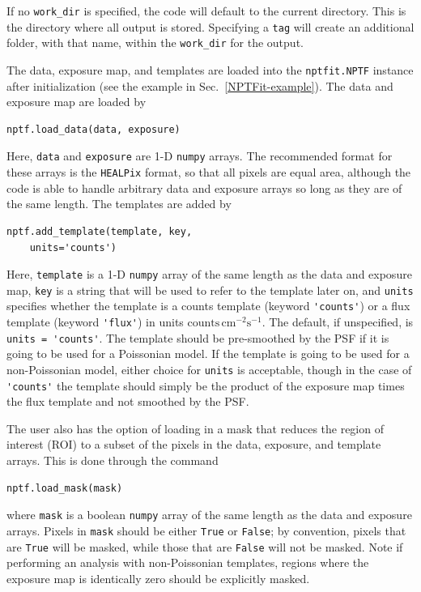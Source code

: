 If no \lstinline{work_dir} is specified, the code will default to the current directory.  This is the directory where all output is stored.  Specifying a \lstinline{tag} will create an additional folder, with that name, within the \lstinline{work_dir} for the output.

The data, exposure map, and templates are loaded into the \lstinline{nptfit.NPTF} instance after initialization (see the example in Sec.~\ref{NPTFit-example}).  The data and exposure map are loaded by 
\begin{lstlisting}
nptf.load_data(data, exposure)
\end{lstlisting}
Here, \lstinline{data} and \lstinline{exposure} are 1-D \texttt{numpy} arrays.  The recommended format for these arrays is the \texttt{HEALPix} format, so that all pixels are equal area, although the code is able to handle arbitrary data and exposure arrays so long as they are of the same length.  The templates are added by 
\begin{lstlisting}
nptf.add_template(template, key, 
    units='counts')
\end{lstlisting}  
Here, \lstinline{template} is a 1-D  \texttt{numpy} array of the same length as the data and exposure map, \lstinline{key} is a string that will be used to refer to the template later on, and \lstinline{units} specifies whether the template is a counts template (keyword \lstinline{'counts'}) or a flux template (keyword \lstinline{'flux'}) in units  $\text{counts}\, \text{cm}^{-2}\text{s}^{-1}$.  The default, if unspecified, is \lstinline{units = 'counts'}.  The template should be pre-smoothed by the PSF if it is going to be used for a Poissonian model.  If the template is going to be used for a non-Poissonian model, either choice for \lstinline{units} is acceptable, though in the case of \lstinline{'counts'} the template should simply be the product of the exposure map times the flux template and not smoothed by the PSF. 

The user also has the option of loading in a mask that reduces the region of interest (ROI) to a subset of the pixels in the data, exposure, and template arrays.  This is done through the command
\begin{lstlisting}
nptf.load_mask(mask)
\end{lstlisting}
where \lstinline{mask} is a boolean \texttt{numpy} array of the same length as the data and exposure arrays.  Pixels in \lstinline{mask} should be either \texttt{True} or \texttt{False}; by convention, pixels that are \texttt{True} will be masked, while those that are \texttt{False} will not be masked.  Note if performing an analysis with non-Poissonian templates, regions where the exposure map is identically zero should be explicitly masked. 

